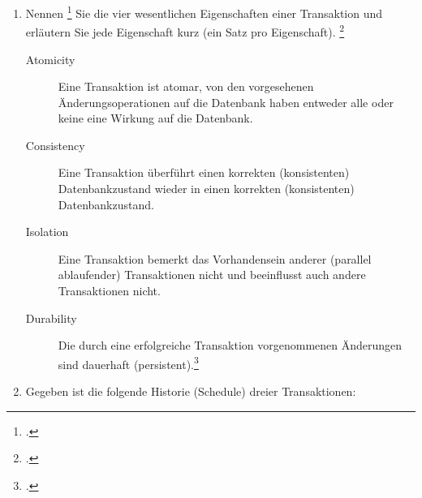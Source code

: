 \documentclass{bschlangaul-aufgabe}
\begin{document}

\begin{enumerate}


\item Nennen \footcite[Aufgabe 1: Transaktionen,
Schedules]{db:pu:5} Sie die vier wesentlichen Eigenschaften
einer Transaktion und erläutern Sie jede Eigenschaft kurz (ein Satz pro
Eigenschaft).
\footcite[Thema 1 Teilaufgabe 1 Aufgabe 5]{examen:46116:2016:03}

\begin{bAntwort}
\begin{description}
\item[Atomicity]

Eine Transaktion ist atomar, \dh von den vorgesehenen
Änderungsoperationen auf die Datenbank haben entweder alle oder keine
eine Wirkung auf die Datenbank.

\item[Consistency]

Eine Transaktion überführt einen korrekten (konsistenten)
Datenbankzustand wieder in einen korrekten (konsistenten)
Datenbankzustand.

\item[Isolation]

Eine Transaktion bemerkt das Vorhandensein anderer (parallel
ablaufender) Transaktionen nicht und beeinflusst auch andere
Transaktionen nicht.

\item[Durability]

Die durch eine erfolgreiche Transaktion vorgenommenen Änderungen sind
dauerhaft (persistent).\footcite[Kapitel 9.5 „Eigenschaften von Transaktionen“, Seite 305]{kemper}
\end{description}
\end{bAntwort}


\item Gegeben ist die folgende Historie (Schedule) dreier Transaktionen:


\end{enumerate}
\end{document}
